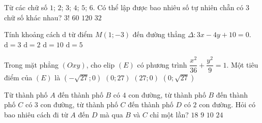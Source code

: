 \begin{ex}%
	Từ các chữ số $1$; $2$; $3$; $4$; $5$; $6$. Có thể lập được bao nhiêu số tự nhiên chẵn có $3$ chữ số khác nhau?
	\choice
	{$3!$}
	{\True $60$}
	{$120$}
	{$32$}
\end{ex}

\begin{ex}%
	Tính khoảng cách $\mathrm{d}$ từ điểm $M(1;-3)$ đến đường thẳng $\Delta\colon 3x-4y +10=0$.
	\choice
	{$\mathrm{d}=3$}
	{$\mathrm{d}=2$}
	{$\mathrm{d}=10$}
	{\True $\mathrm{d}=5$}
\end{ex}

\begin{ex}%
	Trong mặt phẳng $(Oxy)$, cho elip $(E)$ có phương trình $\dfrac{x^2}{36} + \dfrac{y^2}{9}=1$. Một tiêu điểm của $(E)$ là
	\choice
	{\True $\left(-\sqrt{27};0\right)$}
	{$\left(0;27\right)$}
	{$\left(27;0\right)$}
	{$\left(0;\sqrt{27}\right)$}
\end{ex}

\begin{ex}%
	Từ thành phố $A$ đến thành phố $B$ có $4$ con đường, từ thành phố $B$ đến thành phố $C$ có $3$ con đường, từ thành phố $C$ đến thành phố $D$ có $2$ con đường. Hỏi có bao nhiêu cách đi từ $A$ đến $D$ mà qua $B$ và $C$ chỉ một lần?
	\choice
	{$18$}
	{$9$}
	{$10$}
	{\True $24$}
\end{ex}

